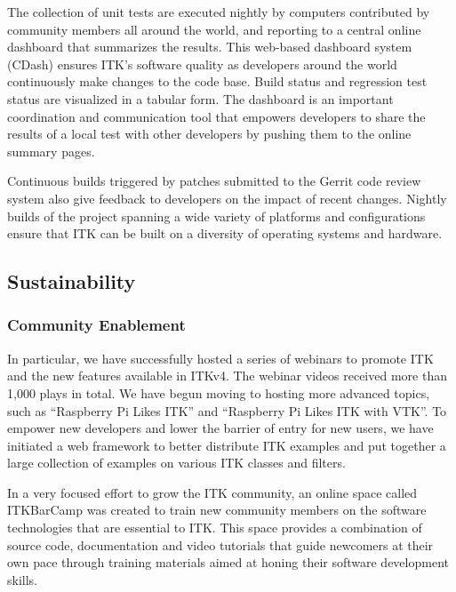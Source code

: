 \documentclass{frontiersENG} %
\begin{document}
The collection of unit tests are executed nightly by computers contributed by community members all around the world, and reporting to a central online dashboard that summarizes the results. This web-based dashboard system (CDash) \cite{ITK dashboard} ensures ITK’s software quality as developers around the world continuously make changes to the code base. Build status and regression test status are visualized in a tabular form. The dashboard is an important coordination and communication tool that empowers developers to share the results of a local test with other developers by pushing them to the online summary pages.

Continuous builds triggered by patches submitted to the Gerrit code review system also give feedback to developers on the impact of recent changes. Nightly builds of the project spanning a wide variety of platforms and configurations ensure that ITK can be built on a diversity of operating systems and hardware.



\subsection{Sustainability}

\subsubsection{Community Enablement}

In particular, we have successfully hosted a series of webinars to promote ITK and the new features available in ITKv4. The webinar videos received more than 1,000 plays in total. We have begun moving to hosting more advanced topics, such as “Raspberry Pi Likes ITK” and “Raspberry Pi Likes ITK with VTK”. To empower new developers and lower the barrier of entry for new users, we have initiated a web framework to better distribute ITK examples and put together a large collection of examples on various ITK classes and filters.

In a very focused effort to grow the ITK community, an online space called ITKBarCamp was created to train new community members on the software technologies that are essential to ITK. This space provides a combination of source code, documentation and video tutorials that guide newcomers at their own pace through training materials aimed at honing their software development skills.
\end{document}
